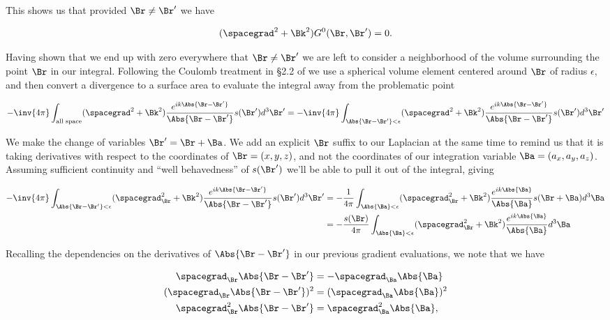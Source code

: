 This shows us that provided $\Br \ne \Br'$ we have

\begin{equation}\label{eqn:helmholtzGreens:n}
(\spacegrad^2 + \Bk^2) G^0(\Br, \Br') = 0.
\end{equation}

Having shown that we end up with zero everywhere that $\Br \ne \Br'$ we are left to consider a neighborhood of the volume surrounding the point $\Br$ in our integral.  Following the Coulomb treatment in \S 2.2 of \cite{schwartz1987pe} we use a spherical volume element centered around $\Br$ of radius $\epsilon$, and then convert a divergence to a surface area to evaluate the integral away from the problematic point

\begin{equation}\label{eqn:helmoltzGreens:n}
-\inv{4\pi} \int_{\text{all space}} (\spacegrad^2 + \Bk^2) \frac{e^{i k \Abs{\Br - \Br'}}}{\Abs{\Br - \Br'}} s(\Br') d^3 \Br'
=
-\inv{4\pi} \int_{\Abs{\Br - \Br'} < \epsilon} (\spacegrad^2 + \Bk^2) \frac{e^{i k \Abs{\Br - \Br'}}}{\Abs{\Br - \Br'}} s(\Br') d^3 \Br'
\end{equation}

We make the change of variables $\Br' = \Br + \Ba$.  We add an explicit $\Br$ suffix to our Laplacian at the same time to remind us that it is taking derivatives with respect to the coordinates of $\Br = (x, y, z)$, and not the coordinates of our integration variable $\Ba = (a_x, a_y, a_z)$.  Assuming sufficient continuity and ``well behavedness'' of $s(\Br')$ we'll be able to pull it out of the integral, giving

\begin{align*}
-\inv{4\pi} \int_{\Abs{\Br - \Br'} < \epsilon} (\spacegrad_\Br^2 + \Bk^2) \frac{e^{i k \Abs{\Br - \Br'}}}{\Abs{\Br - \Br'}} s(\Br') d^3 \Br'
&= 
-\frac{1}{4\pi} \int_{\Abs{\Ba} < \epsilon} (\spacegrad_\Br^2 + \Bk^2) \frac{e^{i k \Abs{\Ba}}}{\Abs{\Ba}} s(\Br + \Ba) d^3 \Ba \\
&= 
-\frac{s(\Br)}{4\pi} \int_{\Abs{\Ba} < \epsilon} (\spacegrad_\Br^2 + \Bk^2) \frac{e^{i k \Abs{\Ba}}}{\Abs{\Ba}} d^3 \Ba 
\end{align*}

Recalling the dependencies on the derivatives of $\Abs{\Br - \Br'}$ in our previous gradient evaluations, we note that we have

\begin{align*}
\spacegrad_\Br \Abs{\Br - \Br'} &= -\spacegrad_\Ba \Abs{\Ba} \\
(\spacegrad_\Br \Abs{\Br - \Br'})^2 &= (\spacegrad_\Ba \Abs{\Ba})^2 \\
\spacegrad_\Br^2 \Abs{\Br - \Br'} &= \spacegrad_\Ba^2 \Abs{\Ba},
\end{align*}

